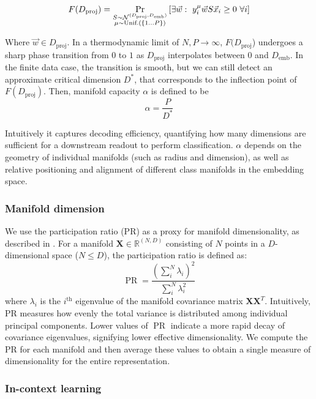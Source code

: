 $$
F(D_\text{proj}) = \displaystyle \mathop{\operatorname{Pr}}_{\substack{
S\sim \mathcal N^{(D_\text{proj}, D_\text{emb})} \\
                  \mu \sim \text{Unif.}(\{1 \dots P\})}
 \\ } \left[  \exists \vec w: \ y_i^\mu \vec w S \vec x_i \geq 0 \ \forall i 
\right]
$$

Where $\vec w\in D_\text{proj}$. In a thermodynamic limit of $N, P \to \infty$, $F(D_\text{proj}$) undergoes a sharp phase transition from $0$ to $1$ as $D_\text{proj}$ interpolates between $0$ and $D_\text{emb}$. In the finite data case, the transition is smooth, but we can still detect an approximate critical dimension $D^*$, that corresponds to the inflection point of $F(D_\text{proj})$. Then, manifold capacity $\alpha$ is defined to be
$$
\alpha = \frac{P}{D^*}
$$

Intuitively it captures decoding efficiency, quantifying how many dimensions are sufficient for a downstream readout to perform classification. $\alpha$ depends on the geometry of individual manifolds (such as radius and dimension), as well as relative positioning and alignment of different class manifolds in the embedding space.

\subsubsection{Manifold dimension}

We use the participation ratio (PR) as a proxy for manifold dimensionality, as described in \cite{gaoTheoryMultineuronalDimensionality2017}. For a manifold $\mathbf{X} \in \mathbb{R}^{(N, D)}$ consisting of $N$ points in a $D$-dimensional space ($N\leq D$), the participation ratio is defined as:
$$
\operatorname{PR} = \frac{\left( \sum_i^N \lambda_i  \right)^2}{\sum_i^N \lambda_i^2 }
$$
where $\lambda_i$ is the $i^\text{th}$ eigenvalue of the manifold covariance matrix $\mathbf{X} \mathbf{X}^T$.
Intuitively, PR measures how evenly the total variance is distributed among individual principal components. Lower values of $\operatorname{PR}$ indicate a more rapid decay of covariance eigenvalues, signifying lower effective dimensionality. We compute the PR for each manifold and then average these values to obtain a single measure of dimensionality for the entire representation.
 
\subsubsection{In-context learning}

